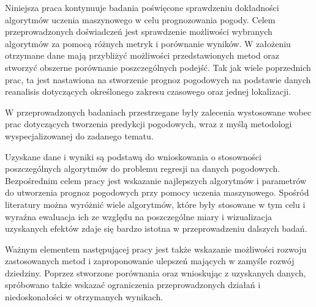 Niniejsza praca kontynuuje badania poświęcone sprawdzeniu dokładności algorytmów uczenia maszynowego
w celu prognozowania pogody. Celem przeprowadzonych doświadczeń jest sprawdzenie 
możliwości wybranych algorytmów za pomocą różnych metryk i porównanie wyników. W założeniu
otrzymane dane mają przybliżyć możliwości przedstawionych metod oraz stworzyć obszerne porównanie
poszczególnych podejść. Tak jak wiele poprzednich prac, ta jest nastawiona na stworzenie
prognoz pogodowych na podstawie danych reanalisis dotyczących określonego zakresu czasowego oraz 
jednej lokalizacji.

W przeprowadzonych badaniach przestrzegane były zalecenia wystosowane wobec 
prac dotyczących tworzenia predykcji pogodowych, wraz z myślą metodologi
wyspecjalizowanej do zadanego tematu.

Uzyskane dane i wyniki są podstawą do wnioskowania o stosowności poszczególnych algorytmów do
problemu regresji na danych pogodowych. Bezpośrednim celem pracy jest wskazanie najlepszych 
algorytmów i parametrów do utworzenia prognoz pogodowych przy pomocy uczenia maszynowego.
Spośród literatury można wyróżnić wiele algorytmów, które były stosowane w tym celu i 
wyraźna ewaluacja ich ze względu na poszczególne miary i wizualizacja uzyskanych efektów zdaje się
bardzo istotna w przeprowadzeniu dalszych badań.

Ważnym elementem następującej pracy jest także wskazanie możliwości rozwoju
zastosowanych metod i zaproponowanie ulepszeń mających w zamyśle rozwój dziedziny.
Poprzez stworzone porównania oraz wnioskując z uzyskanych danych, spróbowano także wskazać
ograniczenia przeprowadzonych działań i niedoskonałości w otrzymanych wynikach.